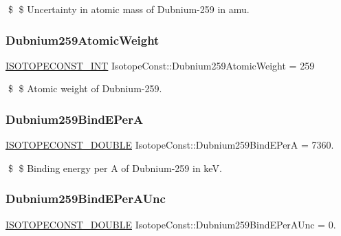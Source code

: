 \$ \$ Uncertainty in atomic mass of Dubnium-\/259 in amu. \mbox{\label{group___isotope_const-_dubnium-_db259_gafd8bc824c56216ae9117f926cc3b2bfc}} 
\subsubsection{\texorpdfstring{Dubnium259\+Atomic\+Weight}{Dubnium259AtomicWeight}}
{\footnotesize\ttfamily \mbox{\hyperlink{group___isotope_const-_macros_ga5f18360b3e99483a35c32d789e62621c}{I\+S\+O\+T\+O\+P\+E\+C\+O\+N\+S\+T\+\_\+\+I\+NT}} Isotope\+Const\+::\+Dubnium259\+Atomic\+Weight = 259}

\$ \$ Atomic weight of Dubnium-\/259. \mbox{\label{group___isotope_const-_dubnium-_db259_ga71549880712820052b1438bdf624db77}} 
\subsubsection{\texorpdfstring{Dubnium259\+Bind\+E\+PerA}{Dubnium259BindEPerA}}
{\footnotesize\ttfamily \mbox{\hyperlink{group___isotope_const-_macros_ga8f45a7272ce02c0b4c65c44636ed719a}{I\+S\+O\+T\+O\+P\+E\+C\+O\+N\+S\+T\+\_\+\+D\+O\+U\+B\+LE}} Isotope\+Const\+::\+Dubnium259\+Bind\+E\+PerA = 7360.}

\$ \$ Binding energy per A of Dubnium-\/259 in keV. \mbox{\label{group___isotope_const-_dubnium-_db259_ga26e492ce01843af46d818846c817c315}} 
\subsubsection{\texorpdfstring{Dubnium259\+Bind\+E\+Per\+A\+Unc}{Dubnium259BindEPerAUnc}}
{\footnotesize\ttfamily \mbox{\hyperlink{group___isotope_const-_macros_ga8f45a7272ce02c0b4c65c44636ed719a}{I\+S\+O\+T\+O\+P\+E\+C\+O\+N\+S\+T\+\_\+\+D\+O\+U\+B\+LE}} Isotope\+Const\+::\+Dubnium259\+Bind\+E\+Per\+A\+Unc = 0.}


